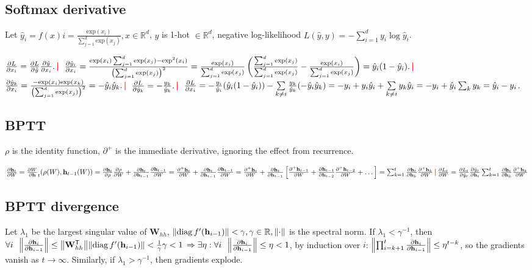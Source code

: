 \documentclass[11pt,landscape,a4paper,fleqn]{article}
\newcommand*{\tran}{^{\mathsf{T}}} %
\DeclareMathOperator{\diag}{\mathrm{diag}}
\newcommand{\R}{\mathbb{R}}
\renewcommand{\exp}{\mathrm{exp}}
\newcommand{\sep}{\,\textcolor{red}{\bm|}\,}
\def\myvector#1{\mathbf{#1}}
\def\vh{{\myvector{h}}}
\def\mymatrix#1{\mathbf{#1}}
\def\mW{{\mymatrix{W}}}
\begin{document}
\begin{multicols*}{4}
\subsection*{Softmax derivative}

Let $\hat{y}_i = f(x)i = \frac{\exp(x_i)}{\sum_{j = 1}^d \exp(x_j)}, x \in \R^d$,
$y$ is 1-hot $\in \R^d$,
negative log-likelihood
$L(\hat{y}, y) = - \sum_{i = 1}^d y_i \log \hat{y}_i$.

$\pdv{L}{x_i} = \pdv{L}{\hat{y}} \pdv{\hat{y}}{x_i}.\sep$
$\pdv{\hat{y}_i}{x_i} = \frac{\exp(x_i) \sum_{j = 1}^d \exp(x_j) - \exp^2(x_i)}{\left(\sum_{j = 1}^d \exp(x_j)\right)^2}
= \frac{\exp(x_i)}{\sum_{j = 1}^d \exp(x_j)} \left(\frac{\sum_{j = 1}^d \exp(x_j)}{\sum_{j = 1}^d \exp(x_j)} - \frac{\exp(x_i)}{\sum_{j = 1}^d \exp(x_j)}\right) = \hat{y}_i(1 - \hat{y}_i). \sep$
$\pdv{\hat{y}_k}{x_i} = \frac{ - \exp(x_i)\exp(x_k)}{\left(\sum_{j = 1}^d \exp(x_j)\right)^2} = - \hat{y}_i \hat{y}_k.\sep$
$\pdv{L}{\hat{y}_k} = - \frac{y_k}{\hat{y}_k}. \sep$
$\pdv{L}{x_i} = - \frac{y_i}{\hat{y}_i} (\hat{y}_i(1 - \hat{y}_i)) - \sum\limits_{k \neq i} \frac{y_k}{\hat{y}_k}( - \hat{y}_i \hat{y}_k) = - y_i + y_i \hat{y}_i + \sum\limits_{k \neq i} y_k \hat{y}_i
= - y_i + \hat{y}_i \sum_k y_k = \hat{y}_i - y_i$.

\subsection*{BPTT}

$\rho$ is the identity function, $\partial^+$ is the immediate derivative, ignoring the effect from recurrence.

$\pdv{\vh_t}{W} = \pdv{W} \vh_t(\rho(W), \vh_{t-1}(W))
= \pdv{\vh_t}{\rho} \pdv{\rho}{W} + \pdv{\vh_t}{\vh_{t-1}} \pdv{\vh_{t-1}}{W}
= \pdv{{}^+ \vh_t}{W} + \pdv{\vh_t}{\vh_{t-1}} \pdv{\vh_{t-1}}{W}
= \pdv{{}^+ \vh_t}{W} + \pdv{\vh_t}{\vh_{t-1}} \left[\pdv{{}^+ \vh_{t-1}}{W} + \pdv{\vh_{t-1}}{\vh_{t-2}}\pdv{{}^+ \vh_{t - 2}}{W} + \dots\right]
= \sum_{k = 1}^t \pdv{\vh_t}{\vh_k} \pdv{{}^+ \vh_k}{W} \sep \pdv{L_t}{W} = \pdv{L_t}{\hat{y}_t} \pdv{\hat{y}_t}{\vh_t} \sum_{k = 1}^t \pdv{\vh_t}{\vh_k} \pdv{{}^+ \vh_k}{W}$

\subsection*{BPTT divergence}

Let $\lambda_1$ be the largest singular value of $\mW_{hh}$,
$\norm{\diag f'(\vh_{i-1})} < \gamma, \gamma \in \R, \norm{\cdot}$ is the spectral norm.
If $\lambda_1 < \gamma^{-1}$, then
$\forall i \ \ \norm{\pdv{\vh_i}{\vh_{i-1}}} \leq \norm{\mW_{hh}\tran} \norm{\diag f'(\vh_{i-1})} < \frac{1}{\gamma}\gamma < 1$
$\Rightarrow \exists \eta : \forall i \ \ \norm{\pdv{\vh_i}{\vh_{i-1}}} \leq \eta < 1$,
by induction over $i$: $\norm{\prod_{i = k + 1}^t \pdv{\vh_i}{\vh_{i-1}}} \leq \eta^{t - k}$,
so the gradients vanish as $t \to \infty$.
Similarly, if $\lambda_1 > \gamma^{-1}$, then gradients explode.


\end{multicols*}
\end{document}
